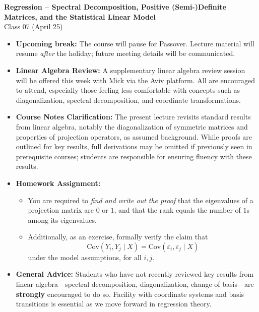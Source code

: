 \documentclass[11pt]{article}
\theoremstyle{definition}
\theoremstyle{plain}
\theoremstyle{definition}
\begin{document}
\begin{center}
    \LARGE \textbf{Regression -- Spectral Decomposition, Positive (Semi-)Definite Matrices, and the Statistical Linear Model} \\
    \large Class 07 (April 25)
\end{center}

\vspace{1em}

\begin{admininfo}
\begin{itemize}
    \item \textbf{Upcoming break:} The course will pause for Passover. Lecture material will resume \textit{after} the holiday; future meeting details will be communicated.
    \item \textbf{Linear Algebra Review:} A supplementary linear algebra review session will be offered this week with Mick via the Aviv platform. All are encouraged to attend, especially those feeling less comfortable with concepts such as diagonalization, spectral decomposition, and coordinate transformations.
    \item \textbf{Course Notes Clarification:} The present lecture revisits standard results from linear algebra, notably the diagonalization of symmetric matrices and properties of projection operators, as assumed background. While proofs are outlined for key results, full derivations may be omitted if previously seen in prerequisite courses; students are responsible for ensuring fluency with these results.
    \item \textbf{Homework Assignment:} 
        \begin{itemize}
        \item You are required to \emph{find and write out the proof} that the eigenvalues of a projection matrix are $0$ or $1$, and that the rank equals the number of $1$s among its eigenvalues.
        \item Additionally, as an exercise, formally verify the claim that 
            \[
                \mathrm{Cov}(Y_i, Y_j \mid X) = \mathrm{Cov}(\varepsilon_i, \varepsilon_j \mid X)
            \]
            under the model assumptions, for all $i, j$.
        \end{itemize}
    \item \textbf{General Advice:} Students who have not recently reviewed key results from linear algebra—spectral decomposition, diagonalization, change of basis—are \textbf{strongly} encouraged to do so. Facility with coordinate systems and basis transitions is essential as we move forward in regression theory.
\end{itemize}
\end{admininfo}
\end{document}
